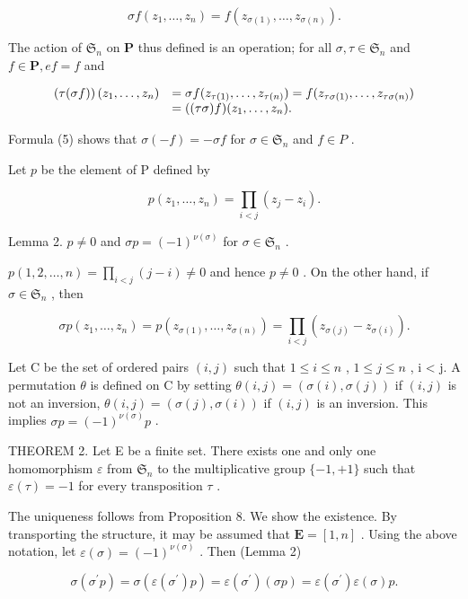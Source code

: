 \[
\sigma f (z _ {1}, \dots , z _ {n}) = f (z _ {\sigma (1)}, \dots , z _ {\sigma (n)}).\tag{5}
\]

The action of \(\mathfrak{S}_n\) on \(\mathbf{P}\) thus defined is an operation; for all \(\sigma, \tau \in \mathfrak{S}_n\) and \(f \in \mathbf{P}, ef = f\) and

\[
\begin{array}{r l} \left(\tau (\sigma f)\right) (z _ {1}, \dots , z _ {n}) & = \sigma f (z _ {\tau (1)}, \dots , z _ {\tau (n)}) = f (z _ {\tau \sigma (1)}, \dots , z _ {\tau \sigma (n)}) \\ & = ((\tau \sigma) f) (z _ {1}, \dots , z _ {n}). \end{array}
\]

Formula (5) shows that \(\sigma(-f) = -\sigma f\) for \(\sigma \in \mathfrak{S}_n\) and \(f \in P\) .

Let \(p\) be the element of P defined by

\[
p (z _ {1}, \dots , z _ {n}) = \prod_ {i <   j} (z _ {j} - z _ {i}).\tag{6}
\]

Lemma 2. \(p \neq 0\) and \(\sigma p = (-1)^{\nu(\sigma)}\) for \(\sigma \in \mathfrak{S}_n\) .

\(p(1,2,\ldots,n) = \prod_{i < j}(j - i)\neq 0\) and hence \(p\neq 0\) . On the other hand, if \(\sigma \in \mathfrak{S}_n\) , then

\[
\sigma p (z _ {1}, \dots , z _ {n}) = p (z _ {\sigma (1)}, \dots , z _ {\sigma (n)}) = \prod_ {i <   j} (z _ {\sigma (j)} - z _ {\sigma (i)}).
\]

Let C be the set of ordered pairs \((i,j)\) such that \(1 \leqslant i \leqslant n\) , \(1 \leqslant j \leqslant n\) , i \textless{} j. A permutation \(\theta\) is defined on C by setting \(\theta(i,j) = (\sigma(i), \sigma(j))\) if \((i,j)\) is not an inversion, \(\theta(i,j) = (\sigma(j), \sigma(i))\) if \((i,j)\) is an inversion. This implies \(\sigma p = (-1)^{\nu(\sigma)} p\) .

THEOREM 2. Let E be a finite set. There exists one and only one homomorphism \(\varepsilon\) from \(\mathfrak{S}_n\) to the multiplicative group \(\{-1, +1\}\) such that \(\varepsilon(\tau) = -1\) for every transposition \(\tau\) .

The uniqueness follows from Proposition 8. We show the existence. By transporting the structure, it may be assumed that \(\mathbf{E} = [1, n]\) . Using the above notation, let \(\varepsilon(\sigma) = (-1)^{\nu(\sigma)}\) . Then (Lemma 2)

\[
\sigma (\sigma^ {\prime} p) = \sigma (\varepsilon (\sigma^ {\prime}) p) = \varepsilon (\sigma^ {\prime}) (\sigma p) = \varepsilon (\sigma^ {\prime}) \varepsilon (\sigma) p.
\]

